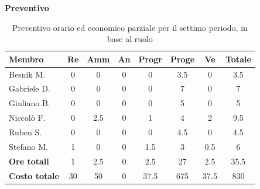\documentclass[a4paper,10pt]{article}
\begin{document}
\textbf{Preventivo} \\
\begin{table}[H]
\centering
\begin{tabular}{|l|c|c|c|c|c|c|c|}
\hline
\textbf{Membro} & \textbf{Re} & \textbf{Amm} & \textbf{An} & \textbf{Progr} & \textbf{Proge} & \textbf{Ve} & \textbf{Totale} \\
\hline
Besnik M.   & 0   & 0   & 0   & 0   & 3.5 & 0   & 3.5 \\
Gabriele D. & 0   & 0   & 0   & 0   & 7   & 0   & 7   \\
Giuliano B. & 0   & 0   & 0   & 0   & 5   & 0   & 5   \\
Niccolò F.  & 0   & 2.5 & 0   & 1   & 4   & 2   & 9.5 \\
Ruben S.    & 0   & 0   & 0   & 0   & 4.5 & 0   & 4.5 \\
Stefano M.  & 1   & 0   & 0   & 1.5 & 3   & 0.5 & 6   \\
\hline
\textbf{Ore totali} & 1  & 2.5 & 0   & 2.5  & 27  & 2.5 & 35.5 \\
\hline
\textbf{Costo totale} & 30  & 50 & 0 & 37.5  & 675  & 37.5 & 830 \\
\hline
\end{tabular}
\caption{Preventivo orario ed economico parziale per il settimo periodo, in base al ruolo}
\end{table}
\end{document}
